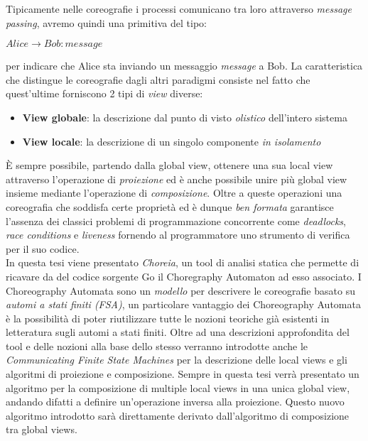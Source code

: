 Tipicamente nelle coreografie i processi comunicano tra loro attraverso \emph{message passing}, avremo quindi una primitiva del tipo:
\begin{center}
    $Alice \rightarrow Bob : message$
\end{center}
per indicare che Alice sta inviando un messaggio \emph{message} a Bob. La caratteristica che distingue le coreografie dagli altri paradigmi consiste nel fatto che quest'ultime forniscono 2 tipi di \emph{view} diverse:
\begin{itemize}
    \item \textbf{View globale}: la descrizione dal punto di visto \emph{olistico} dell'intero sistema
    \item \textbf{View locale}: la descrizione di un singolo componente \emph{in isolamento}
\end{itemize}
È sempre possibile, partendo dalla global view, ottenere una sua local view attraverso l'operazione di \emph{proiezione} ed è anche possibile unire più global view insieme mediante l'operazione di \emph{composizione}\cite{CA_Composition}. Oltre a queste operazioni una coreografia che soddisfa certe proprietà ed è dunque \emph{ben formata} garantisce l'assenza dei classici problemi di programmazione concorrente come \emph{deadlocks}, \emph{race conditions} e \emph{liveness} fornendo al programmatore uno strumento di verifica per il suo codice.\bigskip \\
In questa tesi viene presentato \emph{Choreia}, un tool di analisi statica che permette di ricavare da del codice sorgente Go il Choregraphy Automaton ad esso associato. I Choreography Automata sono un \emph{modello} per descrivere le coreografie basato su \emph{automi a stati finiti (FSA)}, un particolare vantaggio dei Choreography Automata è la possibilità di poter riutilizzare tutte le nozioni teoriche già esistenti in letteratura sugli automi a stati finiti. Oltre ad una descrizioni approfondita del tool e delle nozioni alla base dello stesso verranno introdotte anche le \emph{Communicating Finite State Machines} per la descrizione delle local views e gli algoritmi di proiezione e composizione. Sempre in questa tesi verrà presentato un algoritmo per la composizione di multiple local views in una unica global view, andando difatti a definire un'operazione inversa alla proiezione. Questo nuovo algoritmo introdotto sarà direttamente derivato dall'algoritmo di composizione tra global views.
